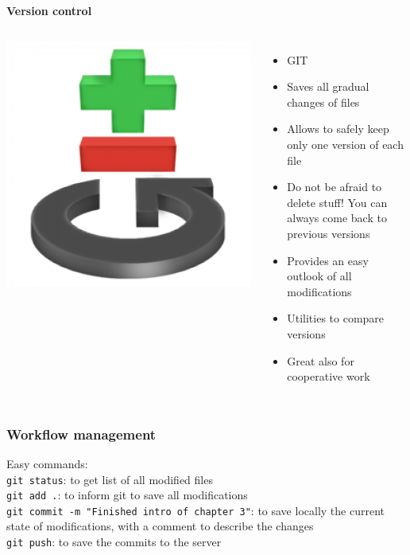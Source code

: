 \documentclass[9pt,xcolor=pdftex,dvipsnames,table]{beamer}
\begin{document}
\begin{frame}{\textbf{Version control}}
\begin{columns}
\centering
\includegraphics[width=1\textwidth]{images/git-logo.png}
\begin{itemize}
\item GIT
\item Saves all gradual changes of files
\item Allows to safely keep only one version of each file 
\item Do not be afraid to delete stuff! You can always come back to previous versions
\item Provides an easy outlook of all modifications
\item Utilities to compare versions
\item Great also for cooperative work
\end{itemize}
\end{columns}
\end{frame}


\begin{frame}[fragile] %
\frametitle{\textbf{Workflow management}}
Easy commands: \\
\verb=git status=: to get list of all modified files \\
\verb=git add .=: to inform git to save all modifications \\
\verb=git commit -m "Finished intro of chapter 3"=: to save locally the
current state of modifications, with a comment to describe the changes \\
\verb=git push=: to save the commits to the server
\end{frame}
\end{document}
